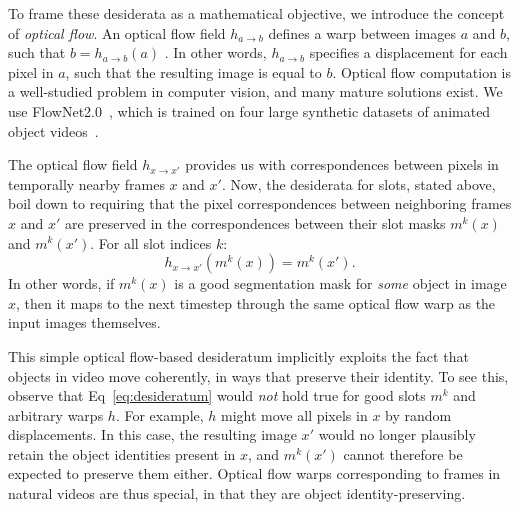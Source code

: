 \documentclass{article}
\newcommand{\jd}[1]{\textcolor{orange}{[DJ: #1]}}
\begin{document}
To frame these desiderata as a mathematical objective, we introduce the concept of \emph{optical flow}. An optical flow field  $h_{a\rightarrow b}$ defines a warp between images $a$ and $b$, such that $b=h_{a\rightarrow b}(a)$ . In other words, $h_{a\rightarrow b}$ specifies a displacement for each pixel in $a$, such that the resulting image is equal to $b$. Optical flow computation is a well-studied problem in computer vision, and many mature solutions exist. We use FlowNet2.0~\cite{flownet2}, which is trained on four large synthetic datasets of animated object videos~\cite{flying3d, flyingchair,chairsd,sintel}. %

The optical flow field $h_{x\rightarrow x'}$ provides us with correspondences between pixels in temporally nearby frames $x$ and $x'$.  
Now, the desiderata for slots, stated above, boil down to requiring that the pixel correspondences between neighboring frames $x$ and $x'$ are preserved in the correspondences between their slot masks $m^k(x)$ and $m^k(x')$. For all slot indices $k$:
\begin{equation}
    h_{x\rightarrow x'}(m^k(x)) = m^k(x'). \label{eq:desideratum}
\end{equation}
In other words, if $m^k(x)$ is a good segmentation mask for \emph{some} object in image $x$, then it maps to the next timestep through the same optical flow warp as the input images themselves. %




This simple optical flow-based desideratum implicitly exploits the fact that objects in video move coherently, in ways that preserve their identity. To see this, observe that Eq~\eqref{eq:desideratum} would \emph{not} hold true for good slots $m^k$ and arbitrary warps $h$. For example, $h$ might move all pixels in $x$ by random displacements. In this case, the resulting image $x'$ would no longer plausibly retain the object identities present in $x$, and $m^k(x')$ cannot therefore be expected to preserve them either. Optical flow warps corresponding to frames in natural videos are thus special, in that they are object identity-preserving.
\end{document}
